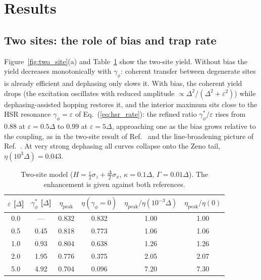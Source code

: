 \documentclass[aps,pre,preprint,floatfix]{revtex4-2}
\newcommand{\gp}{\gamma_\phi}
\newcommand{\gps}{\gamma_\phi^*}
\newcommand{\etap}{\eta_\text{peak}}
\begin{document}
\section{\label{sec:results}Results}

\subsection{\label{sec:two_site}Two sites: the role of bias and trap rate}

Figure~\ref{fig:two_site}(a) and Table~\ref{tab:two_site} show the two-site
yield.
Without bias the yield decreases monotonically with $\gp$: coherent transfer
between degenerate sites is already efficient and dephasing only slows it.
With bias, the coherent yield drops (the excitation oscillates with reduced
amplitude $\propto\Delta^2/(\Delta^2+\varepsilon^2)$) while dephasing-assisted
hopping restores it, and the interior maximum sits close to the HSR resonance
$\gp=\varepsilon$ of Eq.~(\ref{eq:hsr_rate}): the refined ratio
$\gps/\varepsilon$ rises from $0.88$ at $\varepsilon=0.5\Delta$ to $0.99$ at
$\varepsilon=5\Delta$, approaching one as the bias grows relative to the
coupling, as in the two-site result of Ref.~\cite{jacob2024} and the
line-broadening picture of Ref.~\cite{plenio2008}.
At very strong dephasing all curves collapse onto the Zeno tail,
$\eta(10^{3}\Delta)=0.043$.

\begin{table}[htbp]
\caption{\label{tab:two_site}Two-site model ($H=\tfrac{\varepsilon}{2}\sigma_z
  +\tfrac{\Delta}{2}\sigma_x$, $\kappa=0.1\Delta$, $\Gamma=0.01\Delta$).
  The enhancement is given against both references.}
\begin{ruledtabular}
\begin{tabular}{cccccc}
$\varepsilon$ [$\Delta$] & $\gps$ [$\Delta$] & $\etap$ & $\eta(\gp=0)$
  & $\etap/\eta(10^{-3}\Delta)$ & $\etap/\eta(0)$ \\
\hline
0.0 & ---  & 0.832 & 0.832 & 1.00 & 1.00 \\
0.5 & 0.45 & 0.818 & 0.773 & 1.06 & 1.06 \\
1.0 & 0.93 & 0.804 & 0.638 & 1.26 & 1.26 \\
2.0 & 1.95 & 0.776 & 0.375 & 2.05 & 2.07 \\
5.0 & 4.92 & 0.704 & 0.096 & 7.20 & 7.30 \\
\end{tabular}
\end{ruledtabular}
\end{table}
\end{document}
